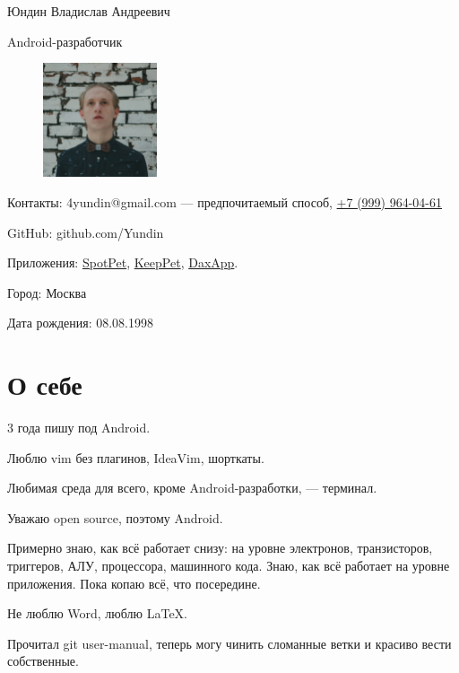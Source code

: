 \documentclass[a4paper,12pt]{article}
\begin{document}
    {\huge Юндин Владислав Андреевич}\par
    {\Large Android-разработчик}

    \setlength\intextsep{0pt}
    \begin{figure}
        \includegraphics[width=0.3\textwidth]{avatar_square}
    \end{figure}

    \bigskip
    Контакты: 4yundin@gmail.com --- предпочитаемый способ, \href{tel:+79999640461}{\color{black}+7 (999) 964-04-61}\par
    GitHub: github.com/Yundin
    
    Приложения: \href{https://play.google.com/store/apps/details?id=com.juntoteam.spotpet}{SpotPet}, \href{https://play.google.com/store/apps/details?id=com.juntoteam.keeppet}{KeepPet}, \href{https://play.google.com/store/apps/details?id=com.app.qavala1}{DaxApp}.
    
    Город: Москва\par
    Дата рождения: 08.08.1998\par

    \vspace{7ex}
    \section*{О себе}

    3 года пишу под Android.

    Люблю vim без плагинов, IdeaVim, шорткаты. 

    Любимая среда для всего, кроме Android-разработки, --- терминал.

    Уважаю open source, поэтому Android.

    Примерно знаю, как всё работает снизу: на уровне электронов, транзисторов, триггеров, АЛУ, процессора, машинного кода. Знаю, как всё работает на уровне приложения. Пока копаю всё, что посередине.

    Не люблю Word, люблю \LaTeX.

    Прочитал git user-manual, теперь могу чинить сломанные ветки и красиво вести собственные.
\end{document}
